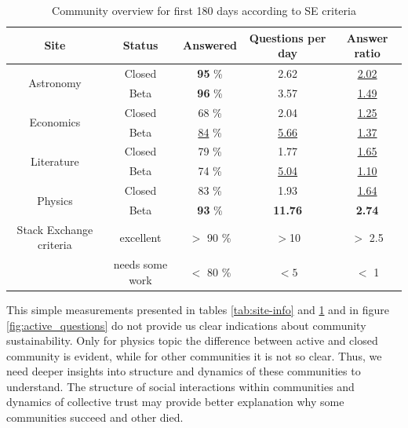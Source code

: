 \begin{table}[h!]
	\caption{Community overview for first 180 days according to SE criteria  }
	
	\label{tab:se_c}
	\begin{tabular}{ccccc}
		\hline
		
		Site & Status &  Answered & Questions per day & Answer ratio \\ \hline
		\multirow{2}{*}{Astronomy} & \multicolumn{1}{c|}{Closed} & \multicolumn{1}{c|}{\textbf{95} \%}  & \multicolumn{1}{c|}{2.62} & \multicolumn{1}{c}{\underline{2.02}} \\
		& \multicolumn{1}{c|}{Beta} & \multicolumn{1}{c|}{\textbf{96} \%}  & \multicolumn{1}{c|}{3.57} & \multicolumn{1}{c}{\underline{1.49}} \\ \hline
		\multirow{2}{*}{Economics} & \multicolumn{1}{c|}{Closed} & \multicolumn{1}{c|}{68 \%}  & \multicolumn{1}{c|}{2.04} & \multicolumn{1}{c}{\underline{1.25}} \\
		& \multicolumn{1}{c|}{Beta} & \multicolumn{1}{c|}{\underline{84} \%}  & \multicolumn{1}{c|}{\underline{5.66}} & \multicolumn{1}{c}{\underline{1.37}} \\ \hline
		\multirow{2}{*}{Literature} & \multicolumn{1}{c|}{Closed} & \multicolumn{1}{c|}{79 \%}  & \multicolumn{1}{c|}{1.77} & \multicolumn{1}{c}{\underline{1.65}} \\
		& \multicolumn{1}{c|}{Beta} & \multicolumn{1}{c|}{74 \%}  & \multicolumn{1}{c|}{\underline{5.04}} & \multicolumn{1}{c}{\underline{1.10}} \\ \hline
		\multirow{2}{*}{Physics} & \multicolumn{1}{c|}{Closed} & \multicolumn{1}{c|}{83 \%}  & \multicolumn{1}{c|}{1.93} & \multicolumn{1}{c}{\underline{1.64}} \\
		& \multicolumn{1}{c|}{Beta} & \multicolumn{1}{c|}{\textbf{93} \%}  & \multicolumn{1}{c|}{\textbf{11.76}} & \multicolumn{1}{c}{ \textbf{2.74}} \\ \hline \hline
		{Stack Exchange criteria} & excellent & $>$ 90 \% & $>$10 & $>$ 2.5   \\
		& needs some work & $<$ 80 \% & $<5$ & $<$ 1   \\ \hline
		
		
	\end{tabular}
	
\end{table}

This simple measurements presented in tables \ref{tab:site-info} and \ref{tab:se_c} and in figure \ref{fig:active_questions} do not provide us clear indications about community sustainability. Only for physics topic the difference between active and closed community is evident, while for other communities it is not so clear. Thus, we need deeper insights into structure and dynamics of these communities to understand. The structure of social interactions within communities and dynamics of collective trust may provide better explanation why some communities succeed and other died. 